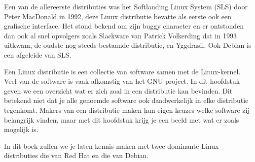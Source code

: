 Een van de allereerste distributies was het Softlanding Linux System (SLS) door Peter MacDonald in 1992, deze Linux distributie bevatte als eerste ook een grafische interface. Het stond bekend om zijn buggy character en er ontstonden dan ook al snel opvolgers zoals Slackware van Patrick Volkerding dat in 1993 uitkwam, de oudste nog steeds bestaande distributie, en Yggdrasil. Ook Debian is een afgeleide van SLS.

Een Linux distributie is een collectie van software samen met de Linux-kernel. Veel van de software is vaak afkomstig van het GNU-project. In dit hoofdstuk geven we een overzicht wat er zich zoal in een distributie kan bevinden. Dit betekend niet dat je alle genoemde software ook daadwerkelijk in elke distributie tegenkomt. Makers van een distributie maken hun eigen keuzes welke software zij belangrijk vinden, maar met dit hoofdstuk krijg je een beeld met wat er zoals mogelijk is.

In dit boek zullen we je laten kennis maken met twee dominante Linux distributies die van Red Hat en die van Debian.

